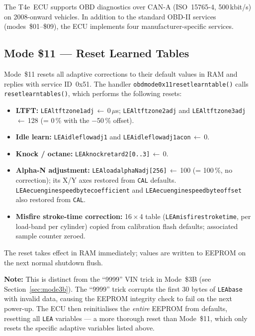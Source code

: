 \documentclass[a4paper,11pt]{article}
\renewcommand{\_}{\oldunderscore\allowbreak}
\begin{document}
The T4e~ECU supports OBD diagnostics over CAN-A (ISO~15765-4, 500\,kbit/s)
on 2008-onward vehicles. In addition to the standard OBD-II services
(modes~\$01--\$09), the ECU implements four manufacturer-specific services.

\subsection{Mode \$11 --- Reset Learned Tables}

Mode~\$11 resets all adaptive corrections to their default values in RAM and
replies with service ID~0x51. The handler
\texttt{obd\_mode\_0x11\_reset\_learn\_table()} calls
\texttt{reset\_learn\_tables()}, which performs the following resets:

\begin{itemize}
\item \textbf{LTFT:} \texttt{LEA\_ltft\_zone1\_adj}\,$\leftarrow$\,0\,$\mu$s;
      \texttt{LEA\_ltft\_zone2\_adj} and \texttt{LEA\_ltft\_zone3\_adj}\,$\leftarrow$\,128
      (= 0\,\% with the $-$50\,\% offset).
\item \textbf{Idle learn:} \texttt{LEA\_idle\_flow\_adj1} and
      \texttt{LEA\_idle\_flow\_adj1\_ac\_on}\,$\leftarrow$\,0.
\item \textbf{Knock / octane:} \texttt{LEA\_knock\_retard2[0..3]}\,$\leftarrow$\,0.
\item \textbf{Alpha-N adjustment:} \texttt{LEA\_load\_alphaN\_adj[256]}\,$\leftarrow$\,100
      (= 100\,\%, no correction); its X/Y axes restored from \texttt{CAL\_} defaults.
      \texttt{LEA\_ecu\_engine\_speed\_byte\_coefficient} and
      \texttt{LEA\_ecu\_engine\_speed\_byte\_offset} also restored from \texttt{CAL\_}.
\item \textbf{Misfire stroke-time correction:} 16\,$\times$\,4 table
      (\texttt{LEA\_misfire\_stroke\_time}, per load-band per cylinder) copied from
      calibration flash defaults; associated sample counter zeroed.
\end{itemize}

The reset takes effect in RAM immediately; values are written to EEPROM on the
next normal shutdown flush.

\textbf{Note:} This is distinct from the ``9999'' VIN trick in Mode~\$3B
(see Section~\ref{sec:mode3b}). The ``9999'' trick corrupts the first 30 bytes
of \texttt{LEA\_base} with invalid data, causing the EEPROM integrity check to
fail on the next power-up. The ECU then reinitialises the \emph{entire} EEPROM
from defaults, resetting all \texttt{LEA\_} variables --- a more thorough reset
than Mode~\$11, which only resets the specific adaptive variables listed above.
\end{document}
